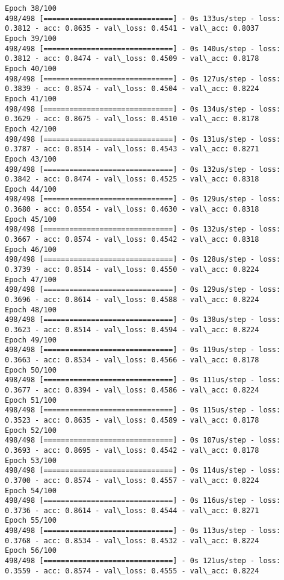\documentclass[11pt]{article}
\begin{document}
\begin{Verbatim}[commandchars=\\\{\}]
Epoch 38/100
498/498 [==============================] - 0s 133us/step - loss: 0.3812 - acc: 0.8635 - val\_loss: 0.4541 - val\_acc: 0.8037
Epoch 39/100
498/498 [==============================] - 0s 140us/step - loss: 0.3812 - acc: 0.8474 - val\_loss: 0.4509 - val\_acc: 0.8178
Epoch 40/100
498/498 [==============================] - 0s 127us/step - loss: 0.3839 - acc: 0.8574 - val\_loss: 0.4504 - val\_acc: 0.8224
Epoch 41/100
498/498 [==============================] - 0s 134us/step - loss: 0.3629 - acc: 0.8675 - val\_loss: 0.4510 - val\_acc: 0.8178
Epoch 42/100
498/498 [==============================] - 0s 131us/step - loss: 0.3787 - acc: 0.8514 - val\_loss: 0.4543 - val\_acc: 0.8271
Epoch 43/100
498/498 [==============================] - 0s 132us/step - loss: 0.3842 - acc: 0.8474 - val\_loss: 0.4525 - val\_acc: 0.8318
Epoch 44/100
498/498 [==============================] - 0s 129us/step - loss: 0.3680 - acc: 0.8554 - val\_loss: 0.4630 - val\_acc: 0.8318
Epoch 45/100
498/498 [==============================] - 0s 132us/step - loss: 0.3667 - acc: 0.8574 - val\_loss: 0.4542 - val\_acc: 0.8318
Epoch 46/100
498/498 [==============================] - 0s 128us/step - loss: 0.3739 - acc: 0.8514 - val\_loss: 0.4550 - val\_acc: 0.8224
Epoch 47/100
498/498 [==============================] - 0s 129us/step - loss: 0.3696 - acc: 0.8614 - val\_loss: 0.4588 - val\_acc: 0.8224
Epoch 48/100
498/498 [==============================] - 0s 138us/step - loss: 0.3623 - acc: 0.8514 - val\_loss: 0.4594 - val\_acc: 0.8224
Epoch 49/100
498/498 [==============================] - 0s 119us/step - loss: 0.3663 - acc: 0.8534 - val\_loss: 0.4566 - val\_acc: 0.8178
Epoch 50/100
498/498 [==============================] - 0s 111us/step - loss: 0.3677 - acc: 0.8394 - val\_loss: 0.4586 - val\_acc: 0.8224
Epoch 51/100
498/498 [==============================] - 0s 115us/step - loss: 0.3523 - acc: 0.8635 - val\_loss: 0.4589 - val\_acc: 0.8178
Epoch 52/100
498/498 [==============================] - 0s 107us/step - loss: 0.3693 - acc: 0.8695 - val\_loss: 0.4542 - val\_acc: 0.8178
Epoch 53/100
498/498 [==============================] - 0s 114us/step - loss: 0.3700 - acc: 0.8574 - val\_loss: 0.4557 - val\_acc: 0.8224
Epoch 54/100
498/498 [==============================] - 0s 116us/step - loss: 0.3736 - acc: 0.8614 - val\_loss: 0.4544 - val\_acc: 0.8271
Epoch 55/100
498/498 [==============================] - 0s 113us/step - loss: 0.3768 - acc: 0.8534 - val\_loss: 0.4532 - val\_acc: 0.8224
Epoch 56/100
498/498 [==============================] - 0s 121us/step - loss: 0.3559 - acc: 0.8574 - val\_loss: 0.4555 - val\_acc: 0.8224

\end{Verbatim}
\end{document}
